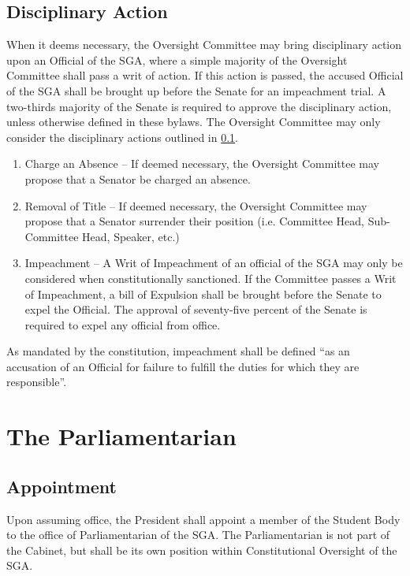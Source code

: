 \documentclass[12pt]{scrreprt}
\begin{document}
\subsection{Disciplinary Action} \label{sec:disciplinary_action}
When it deems necessary, the Oversight Committee may bring disciplinary action upon an Official of the SGA, where a simple majority of the Oversight Committee shall pass a writ of action. If this action is passed, the accused Official of the SGA shall be brought up before the Senate for an impeachment trial. A two-thirds majority of the Senate is required to approve the disciplinary action, unless otherwise defined in these bylaws. The Oversight Committee may only consider the disciplinary actions outlined in \ref{sec:disciplinary_action}. 
\begin{enumerate}
    \item Charge an Absence -- If deemed necessary, the Oversight Committee 
          may propose that a Senator be charged an absence.
    \item Removal of Title -- If deemed necessary, the Oversight Committee may 
          propose that a Senator surrender their position (i.e. Committee 
          Head, Sub-Committee Head, Speaker, etc.) 
    \item Impeachment -- A Writ of Impeachment of an official of the SGA may 
          only be considered when constitutionally sanctioned. If the 
          Committee passes a Writ of Impeachment, a bill of Expulsion shall be 
          brought before the Senate to expel the Official. The approval of 
          seventy-five percent of the Senate is required to expel any 
          official from office. 
\end{enumerate}
As mandated by the constitution, impeachment shall be defined ``as an 
accusation of an Official for failure to fulfill the duties for which they are 
responsible''. 

\section{The Parliamentarian}

\subsection{Appointment}
Upon assuming office, the President shall appoint a member of the Student Body 
to the office of Parliamentarian of the SGA. The Parliamentarian is not part 
of the Cabinet, but shall be its own position within Constitutional Oversight 
of the SGA. 
\end{document}

